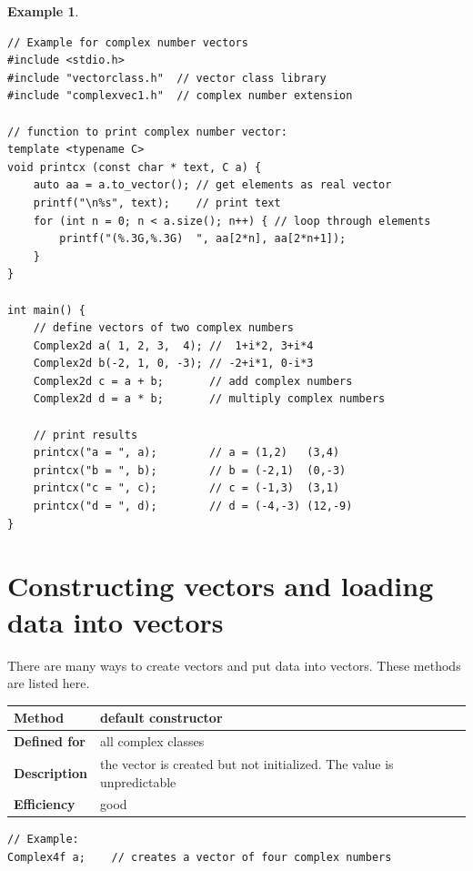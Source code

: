 \documentclass[11pt,a4paper,oneside,openright]{report}
\newtheorem{example}{Example}[chapter]  %
\newcommand{\vspacesmall}{\vspace{3mm}}
\newcommand{\vspacebig}{\vspace{6mm}}
\begin{document}
\begin{example}
\label{exampleRandomGeneration}
\end{example} %
\begin{lstlisting}[frame=single]
// Example for complex number vectors
#include <stdio.h>
#include "vectorclass.h"  // vector class library
#include "complexvec1.h"  // complex number extension

// function to print complex number vector:
template <typename C>
void printcx (const char * text, C a) {
    auto aa = a.to_vector(); // get elements as real vector
    printf("\n%s", text);    // print text
    for (int n = 0; n < a.size(); n++) { // loop through elements
        printf("(%.3G,%.3G)  ", aa[2*n], aa[2*n+1]);
    }
}

int main() {
    // define vectors of two complex numbers
    Complex2d a( 1, 2, 3,  4); //  1+i*2, 3+i*4
    Complex2d b(-2, 1, 0, -3); // -2+i*1, 0-i*3
    Complex2d c = a + b;       // add complex numbers
    Complex2d d = a * b;       // multiply complex numbers

    // print results
    printcx("a = ", a);        // a = (1,2)   (3,4)
    printcx("b = ", b);        // b = (-2,1)  (0,-3)
    printcx("c = ", c);        // c = (-1,3)  (3,1)
    printcx("d = ", d);        // d = (-4,-3) (12,-9)
}
\end{lstlisting}
\vspacesmall


\chapter{Constructing vectors and loading data into vectors} \label{ConstructingVectors}

There are many ways to create vectors and put data into vectors. These methods are listed here.
\vspacebig

\begin{tabular}{|p{25mm}|p{100mm}|}
\hline
\bfseries Method & default constructor \\ \hline
\bfseries Defined for & all complex classes \\ \hline
\bfseries Description & the vector is created but not initialized.\newline
The value is unpredictable \\ \hline
\bfseries Efficiency & good \\ \hline
\end{tabular}
\vspacesmall

\begin{lstlisting}[frame=none]
// Example:
Complex4f a;    // creates a vector of four complex numbers
\end{lstlisting}
\vspacebig
\end{document}
